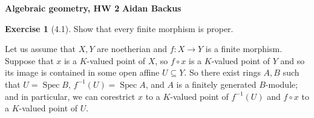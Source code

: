 \documentclass[10pt]{article}
\newcommand{\Spec}{\operatorname{Spec}}
\theoremstyle{definition}
\newtheorem{exer}{Exercise}
\begin{document}
\noindent
\large\textbf{Algebraic geometry, HW 2} \hfill \textbf{Aidan Backus} \\

\begin{exer}[4.1]
Show that every finite morphism is proper.
\end{exer}

Let us assume that $X, Y$ are noetherian and $f: X \to Y$ is a finite morphism.
Suppose that $x$ is a $K$-valued point of $X$, so $f \circ x$ is a $K$-valued point of $Y$ and so its image is contained in some open affine $U \subseteq Y$.
So there exist rings $A, B$ such that $U = \Spec B$, $f^{-1}(U) = \Spec A$, and $A$ is a finitely generated $B$-module; and in particular, we can corestrict $x$ to a $K$-valued point of $f^{-1}(U)$ and $f \circ x$ to a $K$-valued point of $U$.
\end{document}
